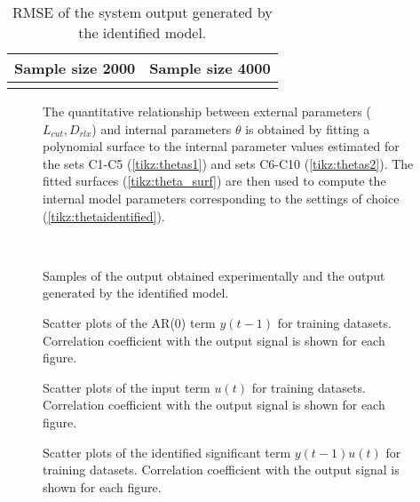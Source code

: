 \documentclass[a4paper,11pt,twoside]{article}
\def\dataset{C}
\theoremstyle{mytheoremstyle}
\begin{document}
\begin{table}[!h]
	\centering
	\caption{RMSE of the system output generated by the identified model.}\label{tab:RMSEs}
		\begin{tabular}{cc}
			Sample size 2000 & Sample size 4000 \\
			\hline	
			\begin{minipage}{2in} \end{minipage}& 
			\begin{minipage}{2in} \vspace{0.5cm}\end{minipage}\\
			\hline
		\end{tabular}
\end{table}

\begin{figure}[!t]
	\centering
	\resizebox{!}{0cm}{
		\begin{minipage}{\textwidth}
		
	\end{minipage}}
	
	\caption{The quantitative relationship between external parameters ($L_{cut}, D_{rlx}$) and internal parameters $\theta$ is obtained by fitting a polynomial surface to the internal parameter values estimated for the sets \dataset1-\dataset5 (\ref{tikz:thetas1}) and sets \dataset6-\dataset10 (\ref{tikz:thetas2}). The fitted surfaces (\ref{tikz:theta_surf}) are then used to compute the internal model parameters corresponding to the settings of choice (\ref{tikz:thetaidentified}).}\label{fig:surfaces_all}
\end{figure}
\begin{figure}[!t]
	\centering
	\subfloat[\dataset3]{\label{fig:c3all}}\\
	\subfloat[\dataset8]{\label{fig:c8all}}
	\caption{Samples of the output obtained experimentally and the output generated by the identified model.}\label{fig:Callout}
\end{figure}

\begin{figure}[!t]
	\centering
	
	\caption{Scatter plots of the AR(0) term $y(t-1)$ for training datasets. Correlation coefficient with the output signal is shown for each figure.}\label{fig:regr_y}
\end{figure}
\begin{figure}[!t]
	\centering
	
	\caption{Scatter plots of the input term $u(t)$ for training datasets. Correlation coefficient with the output signal is shown for each figure.}\label{fig:regr_u}
\end{figure}
\begin{figure}[!t]
	\centering
	
	\caption{Scatter plots of the identified significant term $y(t-1)u(t)$ for training datasets. Correlation coefficient with the output signal is shown for each figure.}\label{fig:regr_first}
\end{figure}
\end{document}
